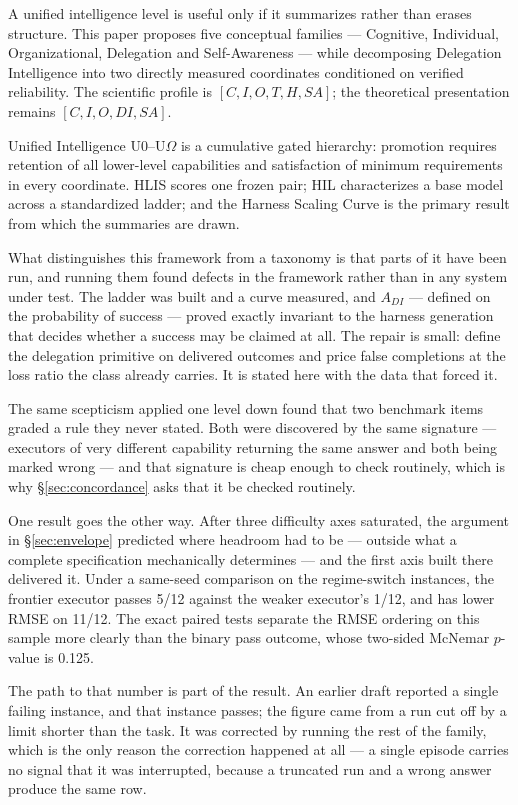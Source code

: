\documentclass[11pt]{article}
\theoremstyle{definition}
\newcommand{\Om}{\ensuremath{\Omega}}
\begin{document}
A unified intelligence level is useful only if it summarizes rather than erases structure. This paper proposes five conceptual families --- Cognitive, Individual, Organizational, Delegation and Self-Awareness --- while decomposing Delegation Intelligence into two directly measured coordinates conditioned on verified reliability. The scientific profile is $[C, I, O, T, H, SA]$; the theoretical presentation remains $[C, I, O, DI, SA]$.

Unified Intelligence U0--U\Om{} is a cumulative gated hierarchy: promotion requires retention of all lower-level capabilities and satisfaction of minimum requirements in every coordinate. HLIS scores one frozen pair; HIL characterizes a base model across a standardized ladder; and the Harness Scaling Curve is the primary result from which the summaries are drawn.

What distinguishes this framework from a taxonomy is that parts of it have been run, and running them found defects in the framework rather than in any system under test. The ladder was built and a curve measured, and $A_{DI}$ --- defined on the probability of success --- proved exactly invariant to the harness generation that decides whether a success may be claimed at all. The repair is small: define the delegation primitive on delivered outcomes and price false completions at the loss ratio the class already carries. It is stated here with the data that forced it.

The same scepticism applied one level down found that two benchmark items graded a rule they never stated. Both were discovered by the same signature --- executors of very different capability returning the same answer and both being marked wrong --- and that signature is cheap enough to check routinely, which is why \S\ref{sec:concordance} asks that it be checked routinely.

One result goes the other way. After three difficulty axes saturated, the argument in \S\ref{sec:envelope} predicted where headroom had to be --- outside what a complete specification mechanically determines --- and the first axis built there delivered it. Under a same-seed comparison on the regime-switch instances, the frontier executor passes 5/12 against the weaker executor's 1/12, and has lower RMSE on 11/12. The exact paired tests separate the RMSE ordering on this sample more clearly than the binary pass outcome, whose two-sided McNemar $p$-value is 0.125.

The path to that number is part of the result. An earlier draft reported a single failing instance, and that instance passes; the figure came from a run cut off by a limit shorter than the task. It was corrected by running the rest of the family, which is the only reason the correction happened at all --- a single episode carries no signal that it was interrupted, because a truncated run and a wrong answer produce the same row.
\end{document}
